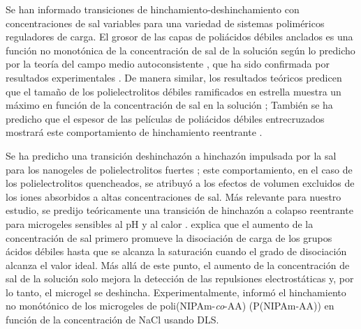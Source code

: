 Se han informado transiciones de hinchamiento-deshinchamiento con concentraciones de sal variables para una variedad de sistemas polim\'ericos reguladores de carga.
El grosor de las capas de poli\'acidos d\'ebiles anclados es una funci\'on no monot\'onica de la concentraci\'on de sal de la soluci\'on seg\'un lo predicho por la teor\'ia del campo medio autoconsistente , que ha sido confirmada por resultados experimentales \addcite [Wu2007].
De manera similar, los resultados te\'oricos predicen que el tama\~no de los polielectrolitos d\'ebiles ramificados en estrella muestra un m\'aximo en funci\'on de la concentraci\'on de sal en la soluci\'on ;
Tambi\'en se ha predicho que el espesor de las pel\'iculas de poliácidos d\'ebiles entrecruzados mostrar\'a este comportamiento de hinchamiento reentrante .

Se ha predicho una transici\'on deshinchaz\'on a hinchaz\'on impulsada por la sal para los nanogeles de polielectrolitos fuertes ;
este comportamiento, en el caso de los polielectrolitos quencheados, se atribuy\'o a los efectos de volumen excluidos de los iones absorbidos a altas concentraciones de sal.
M\'as relevante para nuestro estudio, se predijo te\'oricamente una transici\'on de hinchaz\'on a colapso reentrante para microgeles sensibles al pH y al calor .
 explica que el aumento de la concentraci\'on de sal primero promueve la disociaci\'on de carga de los grupos \'acidos d\'ebiles hasta que se alcanza la saturaci\'on cuando el grado de disociaci\'on alcanza el valor ideal.
M\'as all\'a de este punto, el aumento de la concentraci\'on de sal de la soluci\'on solo mejora la detecci\'on de las repulsiones electrost\'aticas y, por lo tanto, el microgel se deshincha.
Experimentalmente,  inform\'o el hinchamiento no mon\'otónico de los microgeles de poli(NIPAm-\emph{co}-AA) (P(NIPAm-AA)) en funci\'on de la concentraci\'on de NaCl usando DLS.

